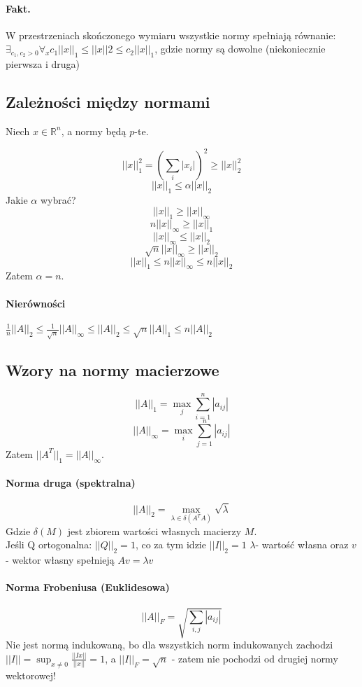 \documentclass{article}
\begin{document}
\paragraph{Fakt.} W przestrzeniach skończonego wymiaru wszystkie normy spełniają równanie:
$ \exists_{c_1, c_2>0}\forall_{x}c_1||x||_1\leq||x||2\leq c_2||x||_1 $, gdzie normy są dowolne (niekoniecznie pierwsza i druga)

\subsection{Zależności między normami}
Niech $ x\in\mathbb{R}^n $, a normy będą $p$-te.

$$ ||x||^2_1=(\sum_i|x_i|)^2 \ge ||x||_2^2$$
$$ ||x||_1\le \alpha||x||_2 $$
Jakie $\alpha$ wybrać?
$$ ||x||_1\ge ||x||_\infty $$
$$ n||x||_\infty\ge ||x||_1 $$
$$ ||x||_\infty\le ||x||_2 $$
$$ \sqrt n||x||_\infty\ge ||x||_2 $$
$$ ||x||_1\leq n||x||_\infty\leq n||x||_2 $$
Zatem $\alpha=n$.
\paragraph{Nierówności}
$ \frac1n ||A||_2\le\frac1{\sqrt n}||A||_\infty\le||A||_2\le\sqrt{n} ||A||_1\le n||A||_2$
\subsection{Wzory na normy macierzowe}
$$ ||A||_1=\max_j\sum_{i=1}^{n} |a_{ij}|$$
$$ ||A||_\infty=\max_i\sum_{j=1}^{n} |a_{ij}|$$
Zatem $ ||A^T||_1=||A||_\infty $.\\
\paragraph{Norma druga (spektralna)}
$$||A||_2=\max_{\lambda\in\delta(A^TA)}\sqrt{\lambda}$$
Gdzie $ \delta(M) $ jest zbiorem wartości własnych macierzy $ M $.\\
Jeśli Q ortogonalna: $||Q||_2=1$, co za tym idzie $ ||I||_2=1 $
$ \lambda $- wartość własna oraz $ v $ - wektor własny spełnieją $ Av=\lambda v $
\paragraph{Norma Frobeniusa (Euklidesowa)}
$$ ||A||_F = \sqrt{\sum_{i,j}|a_{ij}|} $$
Nie jest normą indukowaną, bo dla wszystkich norm indukowanych zachodzi $ ||I||=\sup_{x\not=0}\frac{||Ix||}{||x||}=1 $, a
$ ||I||_F=\sqrt{n} $ - zatem nie pochodzi od drugiej normy wektorowej!
\end{document}
